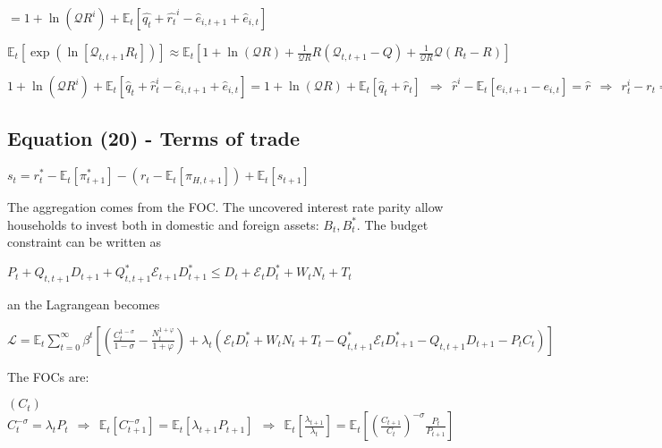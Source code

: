 \documentclass[
]{article}
\begin{document}
\(\displaystyle = 1+ \ln(\mathcal{Q}R^i) + \mathbb{E}_t \left[ \hat{q_t}+\hat{r_t}^i - \hat{e}_{i,t+1}+\hat{e}_{i,t}\right]\)

\(\displaystyle \mathbb{E}_t \left[\exp \left( \ln \left[ \mathcal{Q}_{t,t+1} R_t \right] \right) \right] \approx \mathbb{E}_t \left[ 1 + \ln(\mathcal{Q}R) +\frac{1}{\mathcal{Q}R}R (\mathcal{Q}_{t,t+1}-Q) +\frac{1}{\mathcal{Q}R} \mathcal{Q} (R_t-R)\right]\)

\(\displaystyle 1+ \ln(\mathcal{Q}R^i) + \mathbb{E}_t \left[ \hat{q}_t+\hat{r}_t^i - \hat{e}_{i,t+1} + \hat{e}_{i,t}\right] = 1 + \ln(\mathcal{Q}R) + \mathbb{E}_t \left[ \hat{q}_t + \hat{r}_t \right] \ \ \Rightarrow \ \ \hat{r}^i - \mathbb{E}_t \left[ e_{i,t+1}-e_{i,t}\right] = \hat{r} \ \ \Rightarrow \ \ r_t^i-r_t=\mathbb{E}_t[\Delta e_{i,t+1}]\)

\vspace{12pt}

\hypertarget{equation-20---terms-of-trade}{%
\subsection{Equation (20) - Terms of
trade}\label{equation-20---terms-of-trade}}

\(s_t =r_t^*-\mathbb{E}_t[\pi_{t+1}^*] - (r_t-\mathbb{E}_t[\pi_{H,t+1}])+\mathbb{E}_t[s_{t+1}]\)

\vspace{8pt}

The aggregation comes from the FOC. The uncovered interest rate parity
allow households to invest both in domestic and foreign assets:
\(B_t, B_t^*\). The budget constraint can be written as

\(P_t + Q_{t,t+1}D_{t+1}+Q_{t,t+1}^*\mathcal{E}_{t+1}D_{t+1}^* \leq D_t+\mathcal{E}_{t}D_t^*+W_tN_t+T_t\)

an the Lagrangean becomes

\(\mathcal{L} = \displaystyle \mathbb{E}_t \sum_{t=0}^\infty \beta^t \left[ \left( \frac{C_t^{1-\sigma}}{1-\sigma}-\frac{N_t^{1+\varphi}}{1+\varphi} \right) + \lambda_t \left(\mathcal{E}_t D_t^* + W_tN_t + T_t - Q_{t,t+1}^*\mathcal{E}_t D_{t+1}^* - Q_{t,t+1}D_{t+1} - P_t C_t \right) \right]\)

The FOCs are:

\((C_t)\)
\(\displaystyle C_t^{-\sigma} = \lambda_tP_t \ \ \Rightarrow \ \ \mathbb{E}_t[C_{t+1}^{-\sigma}] = \mathbb{E}_t[\lambda_{t+1}P_{t+1}] \ \ \Rightarrow \ \ \displaystyle \mathbb{E}_t\left[ \frac{\lambda_{t+1}}{\lambda_t}\right] = \mathbb{E}_t\left[ \left( \frac{C_{t+1}}{C_t} \right)^{-\sigma}\frac{P_t}{P_{t+1}}\right]\)
\end{document}
